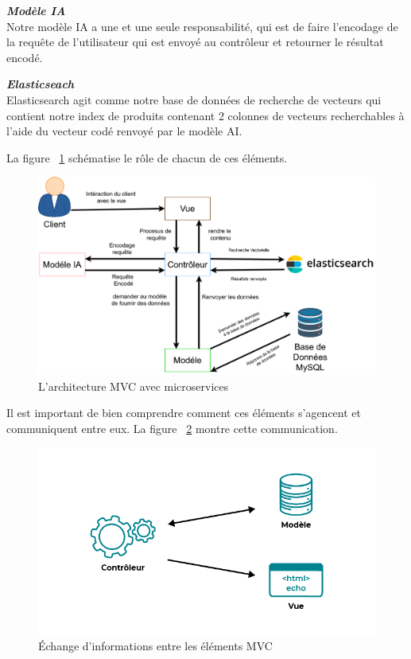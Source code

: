 \noindent
{\small\textbf{\textit{Modèle IA}}}\mbox{}\\
Notre modèle IA a une et une seule responsabilité, qui est de faire l'encodage de la requête de l'utilisateur qui est envoyé au contrôleur et retourner le résultat encodé.

\noindent
{\small\textbf{\textit{Elasticseach}}}\mbox{}\\
Elasticsearch agit comme notre base de données de recherche de vecteurs qui contient notre index de produits contenant 2 colonnes de vecteurs recherchables à l'aide du vecteur codé renvoyé par le modèle AI.

\newpage
\noindent
La figure ~\ref{fig:mvc} schématise le rôle de chacun de ces éléments.
\begin{figure}[H]
\centering
\includegraphics[width=1\textwidth]{logos/mvcavecservice.png}
\caption{L'architecture MVC avec microservices}
\label{fig:mvc}
\end{figure}

\noindent
Il est important de bien comprendre comment ces éléments s'agencent et communiquent entre eux. La figure ~\ref{fig:mvcechange} montre cette communication.

\begin{figure}[H]
\centering
\includegraphics[width=1\textwidth]{logos/mvcechange.png}
\caption{Échange d'informations entre les éléments MVC}
\label{fig:mvcechange}
\end{figure}

